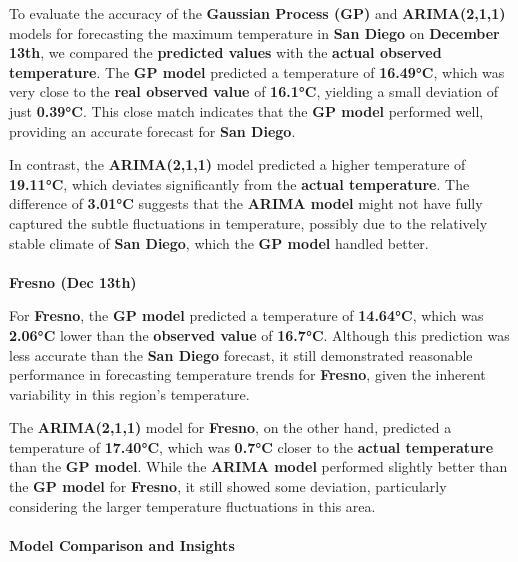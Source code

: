 \documentclass[
  11pt,
]{article}
\makeatletter
\let\oldparagraph\paragraph
\renewcommand{\paragraph}{
    \@ifstar
      \xxxParagraphStar
      \xxxParagraphNoStar
  }
\newcommand{\xxxParagraphStar}[1]{\oldparagraph*{#1}\mbox{}}
\newcommand{\xxxParagraphNoStar}[1]{\oldparagraph{#1}\mbox{}}
\makeatother
\begin{document}
To evaluate the accuracy of the \textbf{Gaussian Process (GP)} and
\textbf{ARIMA(2,1,1)} models for forecasting the maximum temperature in
\textbf{San Diego} on \textbf{December 13th}, we compared the
\textbf{predicted values} with the \textbf{actual observed temperature}.
The \textbf{GP model} predicted a temperature of \textbf{16.49°C}, which
was very close to the \textbf{real observed value} of \textbf{16.1°C},
yielding a small deviation of just \textbf{0.39°C}. This close match
indicates that the \textbf{GP model} performed well, providing an
accurate forecast for \textbf{San Diego}.

In contrast, the \textbf{ARIMA(2,1,1)} model predicted a higher
temperature of \textbf{19.11°C}, which deviates significantly from the
\textbf{actual temperature}. The difference of \textbf{3.01°C} suggests
that the \textbf{ARIMA model} might not have fully captured the subtle
fluctuations in temperature, possibly due to the relatively stable
climate of \textbf{San Diego}, which the \textbf{GP model} handled
better.

\paragraph{\texorpdfstring{\textbf{Fresno (Dec
13th)}}{Fresno (Dec 13th)}}\label{fresno-dec-13th}

For \textbf{Fresno}, the \textbf{GP model} predicted a temperature of
\textbf{14.64°C}, which was \textbf{2.06°C} lower than the
\textbf{observed value} of \textbf{16.7°C}. Although this prediction was
less accurate than the \textbf{San Diego} forecast, it still
demonstrated reasonable performance in forecasting temperature trends
for \textbf{Fresno}, given the inherent variability in this region's
temperature.

The \textbf{ARIMA(2,1,1)} model for \textbf{Fresno}, on the other hand,
predicted a temperature of \textbf{17.40°C}, which was \textbf{0.7°C}
closer to the \textbf{actual temperature} than the \textbf{GP model}.
While the \textbf{ARIMA model} performed slightly better than the
\textbf{GP model} for \textbf{Fresno}, it still showed some deviation,
particularly considering the larger temperature fluctuations in this
area.

\paragraph{\texorpdfstring{\textbf{Model Comparison and
Insights}}{Model Comparison and Insights}}\label{model-comparison-and-insights}
\end{document}
